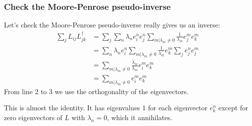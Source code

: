 \documentclass[10pt,aspectratio=169,dvipsnames]{beamer}
\def\l{\lambda}
\begin{document}
\begin{frame}
  \frametitle{Check the Moore-Penrose pseudo-inverse}

  Let's check the Moore-Penrose pseudo-inverse really gives us an inverse:
  \begin{align*}
    \sum_{j} L_{ij}L^\dagger_{jk} &= \sum_j \sum_n \l_n e^n_i e^n_j  \sum_{m | \l_m \neq 0} \frac{1}{\l_m} e^m_j e^m_k \\
&= \sum_n \l_n e^n_i  \sum_{m | \l_m \neq 0} \frac{1}{\l_m} e^m_k \sum_j   e^n_j e^m_j \\
    & =   \sum_{m | \l_m \neq 0} \frac{\l_m}{\l_m} e^m_i e^m_k\\
    & =   \sum_{m | \l_m \neq 0}  e^m_i e^m_k
  \end{align*}
  From line 2 to 3 we use the orthogonality of the eigenvectors.

  This is almost the identity. It has eigenvalues 1 for each eigenvector $e^n_k$ except for zero eigenvectors of $L$ with $\l_n = 0$, which it annihilates.

\end{frame}
\end{document}

